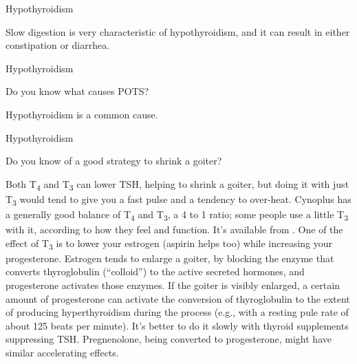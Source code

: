 \documentclass[11pt,oneside,openany,extrafontsizes]{memoir}
\begin{document}
\begin{standalonequote}{Hypothyroidism}

    \begin{answer}
       Slow digestion is very characteristic of hypothyroidism, and it can result in either constipation or diarrhea. 
    \end{answer}
\end{standalonequote}

\begin{qaexchange}{Hypothyroidism}

    \begin{question}
        Do you know what causes POTS?
    \end{question}

    \begin{answer}
      Hypothyroidism is a common cause.
    \end{answer}
\end{qaexchange}

\begin{qaexchange}{Hypothyroidism}

    \begin{question}
        Do you know of a good strategy to shrink a goiter?
    \end{question}

    \begin{answer}
      Both T\textsubscript{4} and T\textsubscript{3} can lower TSH, helping to shrink a goiter, but doing it with just T\textsubscript{3} would tend to give you a fast pulse and a tendency to over-heat. Cynoplus has a generally good balance of T\textsubscript{4} and T\textsubscript{3}, a 4 to 1 ratio; some people use a little T\textsubscript{3} with it, according to how they feel and function. It's available from . One of the effect of T\textsubscript{3} is to lower your estrogen (aspirin helps too) while increasing your progesterone. Estrogen tends to enlarge a goiter, by blocking the enzyme that converts thyroglobulin (\enquote{colloid}) to the active secreted hormones, and progesterone activates those enzymes. If the goiter is visibly enlarged, a certain amount of progesterone can activate the conversion of thyroglobulin to the extent of producing hyperthyroidism during the process (e.g., with a resting pule rate of about 125 beats per minute). It's better to do it slowly with thyroid supplements suppressing TSH. Pregnenolone, being converted to progesterone, might have similar accelerating effects.
    \end{answer}
\end{qaexchange}
\end{document}
